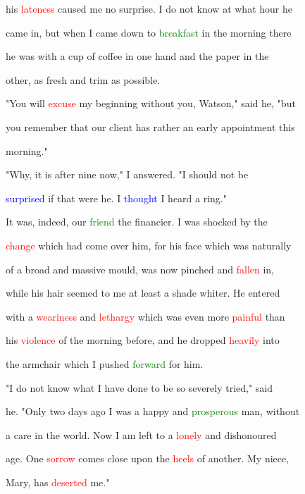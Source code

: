  his \textcolor{red}{lateness} caused me no \textcolor{BurntOrange}{surprise.} I do not know at what hour he

 came in, but when I came down to \textcolor{green}{breakfast} in the morning there

 he was with a cup of coffee in one hand and the paper in the

 other, as fresh and trim as possible.



 "You will \textcolor{red}{excuse} my beginning without you, Watson," said he, "but

 you remember that our client has rather an early appointment this

 morning."



 "Why, it is after nine now," I answered. "I should not be

 \textcolor{blue}{surprised} if that were he. I \textcolor{blue}{thought} I heard a ring."



 It was, indeed, our \textcolor{green}{friend} the financier. I was \textcolor{BurntOrange}{shocked} by the

 \textcolor{red}{change} which had come over him, for his face which was naturally

 of a broad and massive mould, was now pinched and \textcolor{red}{fallen} in,

 while his hair seemed to me at least a shade whiter. He entered

 with a \textcolor{red}{weariness} and \textcolor{red}{lethargy} which was even more \textcolor{red}{painful} than

 his \textcolor{red}{violence} of the morning before, and he dropped \textcolor{red}{heavily} into

 the armchair which I pushed \textcolor{green}{forward} for him.



 "I do not know what I have done to be so severely tried," said

 he. "Only two days ago I was a \textcolor{BurntOrange}{happy} and \textcolor{green}{prosperous} man, without

 a care in the world. Now I am left to a \textcolor{red}{lonely} and dishonoured

 age. One \textcolor{red}{sorrow} comes close upon the \textcolor{red}{heels} of another. My niece,

 Mary, has \textcolor{red}{deserted} me."



